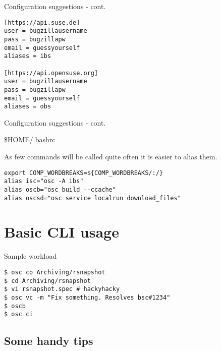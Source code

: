 \documentclass{beamer}
\begin{document}
\begin{frame}[fragile]{Configuration suggestions - cont.}
	\begin{small}
	\begin{verbatim}
[https://api.suse.de]
user = bugzillausername
pass = bugzillapw
email = guessyourself
aliases = ibs

[https://api.opensuse.org]
user = bugzillausername
pass = bugzillapw
email = guessyourself
aliases = obs
	\end{verbatim}
	\end{small}
\end{frame}

\begin{frame}[fragile]{Configuration suggestions - cont.}
	\begin{center}\$HOME/.bashrc\end{center}
	As few commands will be called quite often it is easier to alias them.
	\begin{tiny}
	\begin{verbatim}
export COMP_WORDBREAKS=${COMP_WORDBREAKS/:/}
alias isc="osc -A ibs"
alias oscb="osc build --ccache"
alias oscsd="osc service localrun download_files"
	\end{verbatim}
	\end{tiny}
\end{frame}

\section{Basic CLI usage}

\begin{frame}[fragile]{Sample workload}
	\begin{small}
	\begin{verbatim}
$ osc co Archiving/rsnapshot
$ cd Archiving/rsnapshot
$ vi rsnapshot.spec # hackyhacky
$ osc vc -m "Fix something. Resolves bsc#1234"
$ oscb
$ osc ci
	\end{verbatim}
	\end{small}
\end{frame}

\subsection{Some handy tips}
\end{document}
